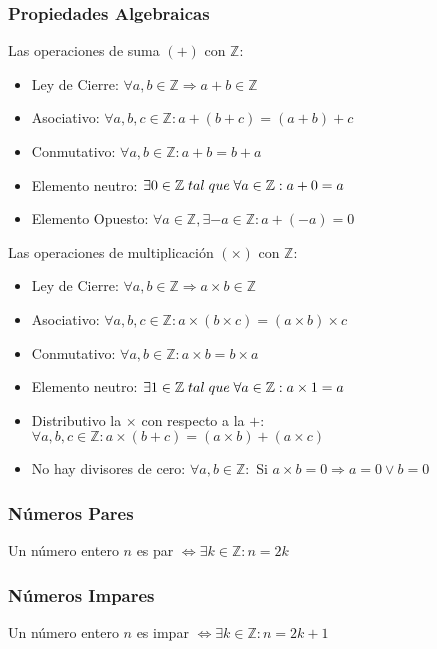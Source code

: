     \subsubsection{Propiedades Algebraicas}
      Las operaciones de suma $(+)$ con $\mathbb{Z}$: 
      \begin{itemize}
	 \item Ley de Cierre: $\forall a, b \in \mathbb{Z} \Rightarrow a+b \in \mathbb{Z}$ 
	 \item Asociativo: $\forall a,b,c \in \mathbb{Z}: a+(b+c)=(a+b)+c $
	 \item Conmutativo: $\forall a,b \in \mathbb{Z}: a+b=b+a$
	 \item Elemento neutro: $\exists 0 \in \mathbb{Z} \thickspace tal \thickspace que \thickspace \forall a \in \mathbb{Z}: a+0=a$
	 \item Elemento Opuesto: $\forall a \in \mathbb{Z}, \exists -a \in \mathbb{Z}: a+(-a)=0$
       \end{itemize}
      Las operaciones de multiplicaci\'on $(\times)$ con $\mathbb{Z}$:
      \begin{itemize}
	 \item Ley de Cierre: $\forall a, b \in \mathbb{Z} \Rightarrow a \times b \in \mathbb{Z}$
	 \item Asociativo: $\forall a,b,c \in \mathbb{Z}: a \times(b \times c)=(a \times b) \times c $
	 \item Conmutativo: $\forall a,b \in \mathbb{Z}: a \times b = b \times a $
	 \item Elemento neutro: $\exists 1 \in \mathbb{Z} \thickspace tal \thickspace que \thickspace \forall a \in \mathbb{Z}: a \times 1= a$
	 \item Distributivo la $\times$ con respecto a la $+$: $\forall a,b,c \in \mathbb{Z}: a \times (b+c)= (a \times b) + (a \times c)$
	 \item No hay divisores de cero:  $ \forall a,b \in \mathbb{Z}:$ Si $a \times b = 0 \Rightarrow a=0 \vee b=0$ 
      \end{itemize}
      \subsubsection{N\'umeros Pares}
      Un n\'umero entero $n$ es par $\Leftrightarrow \exists k \in \mathbb{Z}: n=2k$ 

      \subsubsection{N\'umeros Impares}
      Un n\'umero entero $n$ es impar $\Leftrightarrow \exists k \in \mathbb{Z}: n=2k+1$ 


